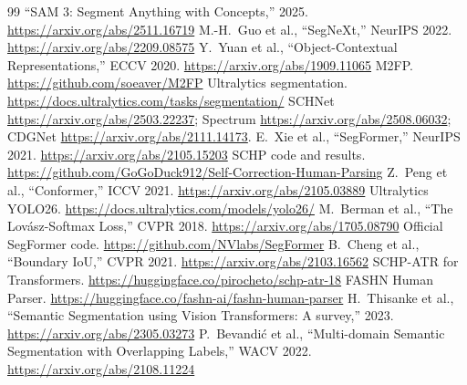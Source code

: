\documentclass[conference,a4paper]{IEEEtran}
\begin{document}
\begin{thebibliography}{99}
 ``SAM 3: Segment Anything with Concepts,'' 2025. \url{https://arxiv.org/abs/2511.16719}
 M.-H.~Guo et al., ``SegNeXt,'' NeurIPS 2022. \url{https://arxiv.org/abs/2209.08575}
 Y.~Yuan et al., ``Object-Contextual Representations,'' ECCV 2020. \url{https://arxiv.org/abs/1909.11065}
 M2FP. \url{https://github.com/soeaver/M2FP}
 Ultralytics segmentation. \url{https://docs.ultralytics.com/tasks/segmentation/}
 SCHNet \url{https://arxiv.org/abs/2503.22237}; Spectrum \url{https://arxiv.org/abs/2508.06032}; CDGNet \url{https://arxiv.org/abs/2111.14173}.
 E.~Xie et al., ``SegFormer,'' NeurIPS 2021. \url{https://arxiv.org/abs/2105.15203}
 SCHP code and results. \url{https://github.com/GoGoDuck912/Self-Correction-Human-Parsing}
 Z.~Peng et al., ``Conformer,'' ICCV 2021. \url{https://arxiv.org/abs/2105.03889}
 Ultralytics YOLO26. \url{https://docs.ultralytics.com/models/yolo26/}
 M.~Berman et al., ``The Lov\'asz-Softmax Loss,'' CVPR 2018. \url{https://arxiv.org/abs/1705.08790}
 Official SegFormer code. \url{https://github.com/NVlabs/SegFormer}
 B.~Cheng et al., ``Boundary IoU,'' CVPR 2021. \url{https://arxiv.org/abs/2103.16562}
 SCHP-ATR for Transformers. \url{https://huggingface.co/pirocheto/schp-atr-18}
 FASHN Human Parser. \url{https://huggingface.co/fashn-ai/fashn-human-parser}
 H.~Thisanke et al., ``Semantic Segmentation using Vision Transformers: A survey,'' 2023. \url{https://arxiv.org/abs/2305.03273}
 P.~Bevandi\'c et al., ``Multi-domain Semantic Segmentation with Overlapping Labels,'' WACV 2022. \url{https://arxiv.org/abs/2108.11224}
\end{thebibliography}
\end{document}
